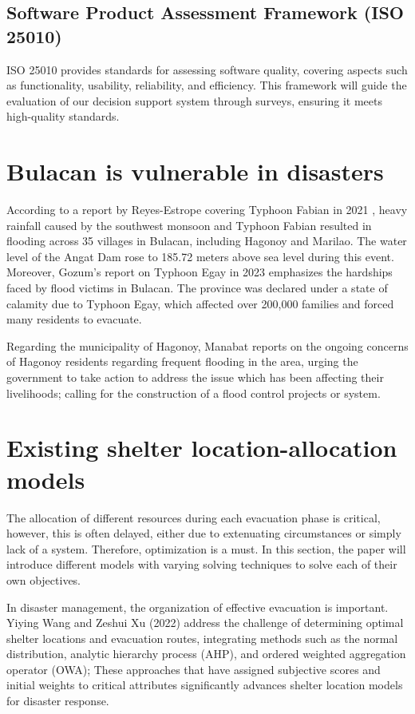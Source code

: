 \subsection{Software Product Assessment Framework (ISO 25010)}
	ISO 25010 provides standards for assessing software quality, covering aspects such as functionality, usability, reliability, and efficiency. This framework will guide the evaluation of our decision support system through surveys, ensuring it meets high-quality standards.

\section{Bulacan is vulnerable in disasters}
	According to a report by Reyes-Estrope covering Typhoon Fabian in 2021 \parencite{Carmela2021}, heavy rainfall caused by the southwest monsoon and Typhoon Fabian resulted in flooding across 35 villages in Bulacan, including Hagonoy and Marilao. The water level of the Angat Dam rose to 185.72 meters above sea level during this event. Moreover, Gozum's report on Typhoon Egay in 2023 \parencite{Iya2023} emphasizes the hardships faced by flood victims in Bulacan. The province was declared under a state of calamity due to Typhoon Egay, which affected over 200,000 families and forced many residents to evacuate.
	
	Regarding the municipality of Hagonoy, Manabat reports on the ongoing concerns of Hagonoy residents regarding frequent flooding in the area, urging the government to take action to address the issue which has been affecting their livelihoods; calling for the construction of a flood control projects or system. \parencite{Jacque2022}

\section{Existing shelter location-allocation models}
The allocation of different resources during each evacuation phase is critical, however, this is often delayed, either due to extenuating circumstances or simply lack of a system. Therefore, optimization is a must. In this section, the paper will introduce different models with varying solving techniques to solve each of their own objectives.

In disaster management, the organization of effective evacuation is important. Yiying Wang and Zeshui Xu (2022) address the challenge of determining optimal shelter locations and evacuation routes, integrating methods such as the normal distribution, analytic hierarchy process (AHP), and ordered weighted aggregation operator (OWA); These approaches that have assigned subjective scores and initial weights to critical attributes significantly advances shelter location models for disaster response. \parencite{Yiying2022}

